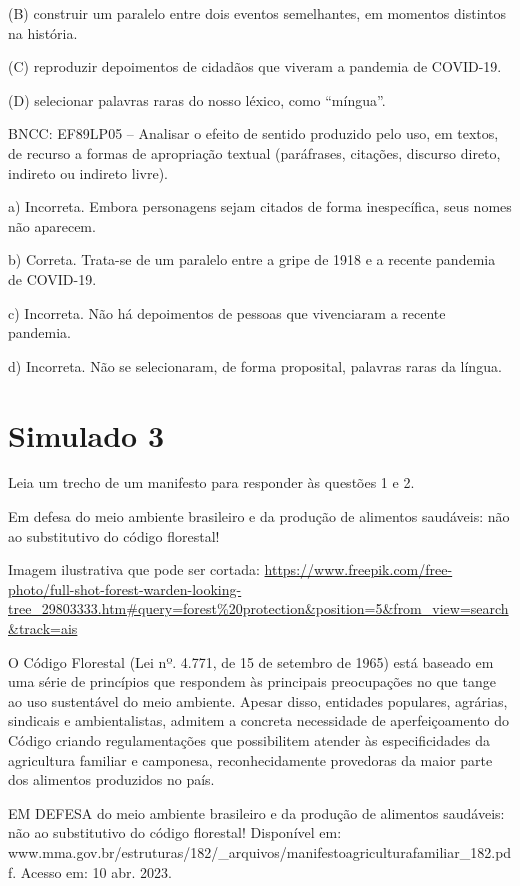 \begin{itemize}
\begin{itemize}
\begin{escolha}
\begin{escolha}
\begin{escolha}
\begin{escolha}
\begin{escolha}
(B) construir um paralelo entre dois eventos semelhantes, em momentos
distintos na história.

(C) reproduzir depoimentos de cidadãos que viveram a pandemia de
COVID-19.

(D) selecionar palavras raras do nosso léxico, como ``míngua''.

BNCC: EF89LP05 -- Analisar o efeito de sentido produzido pelo uso, em
textos, de recurso a formas de apropriação textual (paráfrases,
citações, discurso direto, indireto ou indireto livre).

a) Incorreta. Embora personagens sejam citados de forma inespecífica,
seus nomes não aparecem.

b) Correta. Trata-se de um paralelo entre a gripe de 1918 e a recente
pandemia de COVID-19.

c) Incorreta. Não há depoimentos de pessoas que vivenciaram a recente
pandemia.

d) Incorreta. Não se selecionaram, de forma proposital, palavras raras
da língua.

\chapter{Simulado 3}

Leia um trecho de um manifesto para responder às questões 1 e 2.

Em defesa do meio ambiente brasileiro e da produção de alimentos
saudáveis: não ao substitutivo do código florestal!

Imagem ilustrativa que pode ser cortada:
\url{https://www.freepik.com/free-photo/full-shot-forest-warden-looking-tree_29803333.htm\#query=forest\%20protection\&position=5\&from_view=search\&track=ais}

O Código Florestal (Lei nº. 4.771, de 15 de setembro de 1965) está
baseado em uma série de princípios que respondem às principais
preocupações no que tange ao uso sustentável do meio ambiente. Apesar
disso, entidades populares, agrárias, sindicais e ambientalistas,
admitem a concreta necessidade de aperfeiçoamento do Código criando
regulamentações que possibilitem atender às especificidades da
agricultura familiar e camponesa, reconhecidamente provedoras da maior
parte dos alimentos produzidos no país.

EM DEFESA do meio ambiente brasileiro e da produção de alimentos
saudáveis: não ao substitutivo do código florestal! Disponível em:
www.mma.gov.br/estruturas/182/\_arquivos/manifestoagriculturafamiliar\_182.pdf.
Acesso em: 10 abr. 2023.


\end{escolha}
\end{escolha}
\end{escolha}
\end{escolha}
\end{escolha}
\end{itemize}
\end{itemize}
